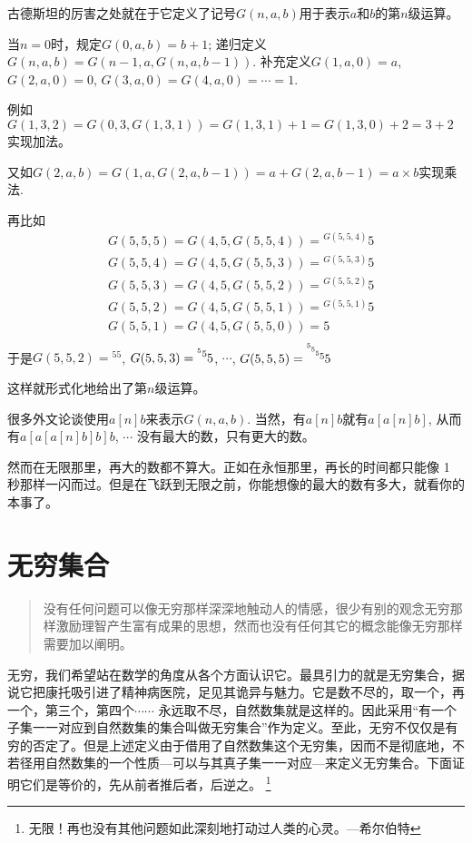 \documentclass{article}
\theoremstyle{nonumberplain}\theorembodyfont{\normalfont}\theoremsymbol{$\Box$}
\begin{document}
古德斯坦的厉害之处就在于它定义了记号$G(n,a,b)$用于表示$a$和$b$的第$n$级运算。

当$n=0$时，规定$G(0,a,b)=b+1$;
递归定义$G(n,a,b)=G(n-1,a,G(n,a,b-1))$. 补充定义$G(1,a,0)=a$, $G(2,a,0)=0$, $G(3,a,0)=G(4,a,0)=\cdots=1$.

例如$G(1,3,2)=G(0,3,G(1,3,1))=G(1,3,1)+1=G(1,3,0)+2=3+2$
实现加法。

又如$G(2,a,b)=G(1,a,G(2,a,b-1))=a+G(2,a,b-1)=a\times b$实现乘法. 

再比如
\begin{align*}
&G(5,5,5)=G(4,5,G(5,5,4))={}^{G(5,5,4)}5\\
&G(5,5,4)=G(4,5,G(5,5,3))={}^{G(5,5,3)}5\\
&G(5,5,3)=G(4,5,G(5,5,2))={}^{G(5,5,2)}5\\
&G(5,5,2)=G(4,5,G(5,5,1))={}^{G(5,5,1)}5\\
&G(5,5,1)=G(4,5,G(5,5,0))=5\\
\end{align*}
\def\ssc{\scriptscriptstyle}
于是$G(5,5,2)={}^55$, $G(5,5,3)=\raisebox{1ex}{$\sc{}^55$}5$, $\cdots$, $G(5,5,5)=\raisebox{12pt}{$\ssc5$}\raisebox{9pt}{$\ssc5$}\raisebox{6pt}{$\ssc5$}\raisebox{3pt}{$\sc5$}5$

这样就形式化地给出了第$n$级运算。

很多外文论谈使用$a[n]b$来表示$G(n,a,b)$. 当然，有$a[n]b$就有$a[a[n]b]$, 从而有$a[a[a[n]b]b]b$, $\cdots$ 没有最大的数，只有更大的数。

然而在无限那里，再大的数都不算大。正如在永恒那里，再长的时间都只能像 1 秒那样一闪而过。但是在飞跃到无限之前，你能想像的最大的数有多大，就看你的本事了。


\section{无穷集合}
\begin{quote}
没有任何问题可以像无穷那样深深地触动人的情感，很少有别的观念无穷那样激励理智产生富有成果的思想，然而也没有任何其它的概念能像无穷那样需要加以阐明。
\end{quote}
无穷，我们希望站在数学的角度从各个方面认识它。最具引力的就是无穷集合，据说它把康托吸引进了精神病医院，足见其诡异与魅力。它是数不尽的，取一个，再一个，第三个，第四个$\cdots\cdots$ 永远取不尽，自然数集就是这样的。因此采用“有一个子集一一对应到自然数集的集合叫做无穷集合”作为定义。至此，无穷不仅仅是有穷的否定了。但是上述定义由于借用了自然数集这个无穷集，因而不是彻底地，不若径用自然数集的一个性质---可以与其真子集一一对应---来定义无穷集合。下面证明它们是等价的，先从前者推后者，后逆之。
\footnote{无限！再也没有其他问题如此深刻地打动过人类的心灵。---希尔伯特}
\end{document}
